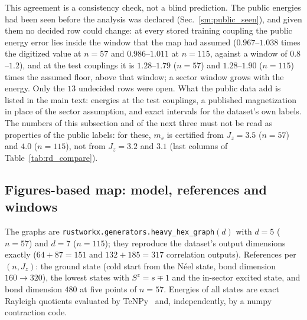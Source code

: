 \documentclass[aps,prx,onecolumn,10pt,nofootinbib,longbibliography,floatfix]{revtex4-2}
\theoremstyle{remark}
\newcommand{\Jz}{J_z}
\newcommand{\ms}{m_s}
\begin{document}
This agreement is a consistency check, not a blind prediction. The public energies had been seen before the
analysis was declared (Sec.~\ref{sm:public_seen}), and given them no decided row could change: at every stored
training coupling the public energy error lies inside the window that the map had assumed ($0.967$--$1.038$ times %
the digitized value at $n=57$ and $0.986$--$1.011$ at $n=115$, against a window of $0.8$--$1.2$), and at the test %
couplings it is $1.28$--$1.79$ ($n=57$) and $1.28$--$1.90$ ($n=115$) times the assumed floor, above that window; a %
sector window grows with the energy. Only the $13$ undecided rows were open. What the public data add is listed in %
the main text: energies at the test couplings, a published magnetization in place of the sector assumption, and
exact intervals for the dataset's own labels. The numbers of this subsection and of the next three must not be read
as properties of the public labels: for these, $\ms$ is certified from $\Jz=3.5$ ($n=57$) and $4.0$ ($n=115$), not
from $\Jz=3.2$ and $3.1$ (last columns of Table~\ref{tab:rd_compare}).

\def\SMcap{The figures-based map against the public energies. Columns 2--4: thresholds and counts of the stored map %
(sector states, digitized energies, DMRG-referenced). Columns 5--6: the same rule at the published energy (sector
states; a statement about the model, not a certificate of a public label). Columns 7--8: the map on the public data
(exact intervals in the window of energy and mean magnetization).}\def\SMlab{tab:rd_compare}


\subsection{Figures-based map: model, references and windows}
\label{sm:figmodel}
The graphs are \texttt{rustworkx.generators.heavy\_hex\_graph}$(d)$ with $d=5$ ($n=57$) and $d=7$ ($n=115$); they %
reproduce the dataset's output dimensions exactly ($64+87=151$ and $132+185=317$ correlation outputs). References per %
$(n,\Jz)$: the ground state (cold start from the N\'eel state, bond dimension $160\to320$), the lowest states with %
$S^z=s\mp1$ and the in-sector excited state, and bond dimension $480$ at five points of $n=57$. %
Energies of all states are exact Rayleigh quotients evaluated by TeNPy~\cite{hauschild2018,hauschild2024} and, %
independently, by a numpy contraction code.
\end{document}
